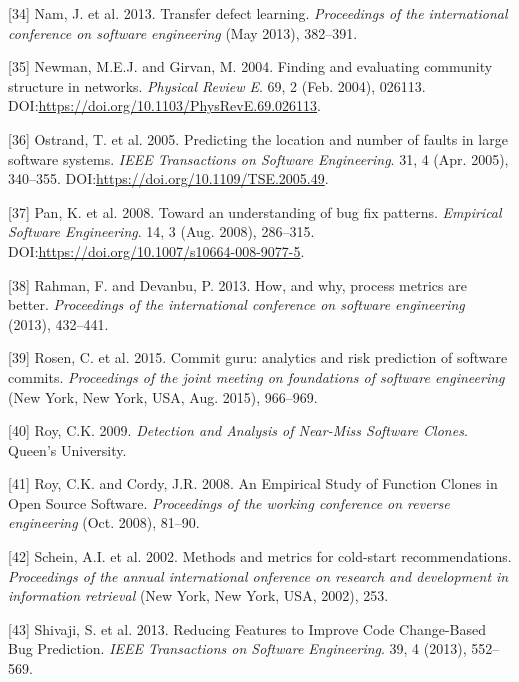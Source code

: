 \documentclass[sigconf]{acmart}
\begin{document}
\hypertarget{ref-Nam2013}{}
{[}34{]} Nam, J. et al. 2013. Transfer defect learning.
\emph{Proceedings of the international conference on software
engineering} (May 2013), 382--391.

\hypertarget{ref-Newman2004}{}
{[}35{]} Newman, M.E.J. and Girvan, M. 2004. Finding and evaluating
community structure in networks. \emph{Physical Review E}. 69, 2 (Feb.
2004), 026113. DOI:\url{https://doi.org/10.1103/PhysRevE.69.026113}.

\hypertarget{ref-Ostrand2005}{}
{[}36{]} Ostrand, T. et al. 2005. Predicting the location and number of
faults in large software systems. \emph{IEEE Transactions on Software
Engineering}. 31, 4 (Apr. 2005), 340--355.
DOI:\url{https://doi.org/10.1109/TSE.2005.49}.

\hypertarget{ref-Pan2008}{}
{[}37{]} Pan, K. et al. 2008. Toward an understanding of bug fix
patterns. \emph{Empirical Software Engineering}. 14, 3 (Aug. 2008),
286--315. DOI:\url{https://doi.org/10.1007/s10664-008-9077-5}.

\hypertarget{ref-rahman2013}{}
{[}38{]} Rahman, F. and Devanbu, P. 2013. How, and why, process metrics
are better. \emph{Proceedings of the international conference on
software engineering} (2013), 432--441.

\hypertarget{ref-Rosen2015}{}
{[}39{]} Rosen, C. et al. 2015. Commit guru: analytics and risk
prediction of software commits. \emph{Proceedings of the joint meeting
on foundations of software engineering} (New York, New York, USA, Aug.
2015), 966--969.

\hypertarget{ref-Iss2009}{}
{[}40{]} Roy, C.K. 2009. \emph{Detection and Analysis of Near-Miss
Software Clones}. Queen's University.

\hypertarget{ref-Roy2008}{}
{[}41{]} Roy, C.K. and Cordy, J.R. 2008. An Empirical Study of Function
Clones in Open Source Software. \emph{Proceedings of the working
conference on reverse engineering} (Oct. 2008), 81--90.

\hypertarget{ref-Schein2002}{}
{[}42{]} Schein, A.I. et al. 2002. Methods and metrics for cold-start
recommendations. \emph{Proceedings of the annual international onference
on research and development in information retrieval} (New York, New
York, USA, 2002), 253.

\hypertarget{ref-Shivaji2013}{}
{[}43{]} Shivaji, S. et al. 2013. Reducing Features to Improve Code
Change-Based Bug Prediction. \emph{IEEE Transactions on Software
Engineering}. 39, 4 (2013), 552--569.
\end{document}
